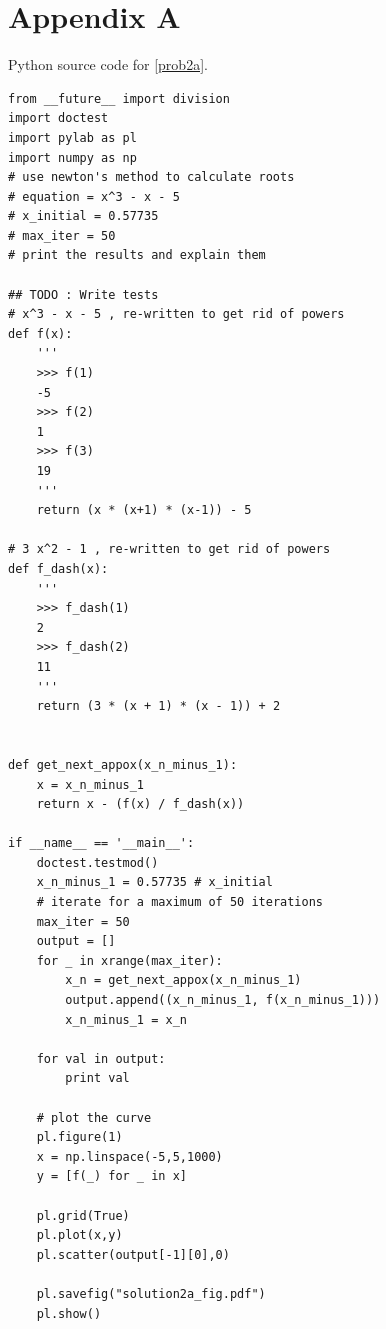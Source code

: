 \documentclass[a4paper,11pt]{article}
\begin{document}
\section{Appendix A}\label{code:problem2a}
Python source code for \ref{prob2a}.
{\footnotesize
\begin{lstlisting}
from __future__ import division
import doctest
import pylab as pl
import numpy as np
# use newton's method to calculate roots
# equation = x^3 - x - 5
# x_initial = 0.57735
# max_iter = 50
# print the results and explain them

## TODO : Write tests
# x^3 - x - 5 , re-written to get rid of powers
def f(x):
	'''
	>>> f(1)
	-5
	>>> f(2)
	1
	>>> f(3)
	19
	'''
	return (x * (x+1) * (x-1)) - 5

# 3 x^2 - 1 , re-written to get rid of powers
def f_dash(x):
	'''
	>>> f_dash(1)
	2
	>>> f_dash(2)
	11
	'''
	return (3 * (x + 1) * (x - 1)) + 2


def get_next_appox(x_n_minus_1):
	x = x_n_minus_1
	return x - (f(x) / f_dash(x))

if __name__ == '__main__':
	doctest.testmod()
	x_n_minus_1 = 0.57735 # x_initial
	# iterate for a maximum of 50 iterations
	max_iter = 50
	output = []
	for _ in xrange(max_iter):
		x_n = get_next_appox(x_n_minus_1)
		output.append((x_n_minus_1, f(x_n_minus_1)))
		x_n_minus_1 = x_n
	
	for val in output:
		print val
	
	# plot the curve
	pl.figure(1)
	x = np.linspace(-5,5,1000)
	y = [f(_) for _ in x]
	
	pl.grid(True)
	pl.plot(x,y)
	pl.scatter(output[-1][0],0)
	
	pl.savefig("solution2a_fig.pdf")
	pl.show()
\end{lstlisting}
}



\clearpage
\end{document}
